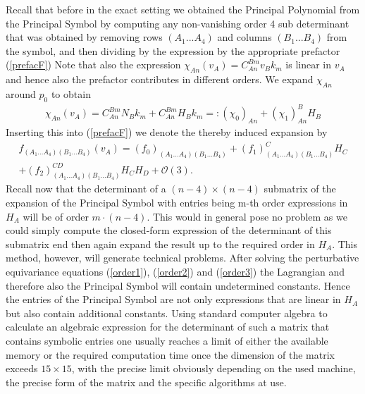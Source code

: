 \documentclass[a4paper,12pt, DIV=14, BCOR=5mm, twoside, headsepline, numbers=noenddot]{scrbook}
\begin{document}
Recall that before in the exact setting we obtained the Principal Polynomial from the Principal Symbol by computing any non-vanishing order 4 sub determinant that was obtained by removing rows $(A_1...A_4)$ and columns $(B_1...B_4)$ from the symbol, and then dividing by the expression by the appropriate prefactor (\ref{prefacF})
Note that also the expression $\chi_{An}(v_A) = C_{An}^{Bm}v_Bk_m$ is linear in $v_A$ and hence also the prefactor contributes in different orders. We expand $\chi_{An}$ around $p_0$ to obtain
\begin{align}
\chi_{An}(v_A) =  C^{Bm}_{An} N_B k_m + C^{Bm}_{An} H_B k_m =: (\chi_0)_{An} + (\chi_1)^B_{An}H_B
\end{align}
Inserting this into (\ref{prefacF}) we denote the thereby induced expansion by
\begin{multline}\label{prefacExp}
    f_{(A_1...A_4)(B_1...B_4)}(v_A) = (f_0)_{(A_1...A_4)(B_1...B_4)} + (f_1)^C_{(A_1...A_4)(B_1...B_4)}H_C\\ + (f_2)^{CD}_{(A_1...A_4)(B_1...B_4)}H_CH_D
    + \mathcal{O}(3).
\end{multline}
Recall now that the determinant of a $(n-4) \times (n-4)$ submatrix of the expansion of the Principal Symbol with entries being m-th order expressions in $H_A$ will be of order $m\cdot(n-4)$. This would in general pose no problem as we could simply compute the closed-form expression of the determinant of this submatrix end then again expand the result up to the required order in $H_A$. This method, however, will generate technical problems. After solving the perturbative equivariance equations (\ref{order1}), (\ref{order2}) and (\ref{order3}) the Lagrangian and therefore also the Principal Symbol will contain undetermined constants. Hence the entries of the Principal Symbol are not only expressions that are linear in $H_A$ but also contain additional constants. Using standard computer algebra to calculate an algebraic expression for the determinant of such a matrix that contains symbolic entries one usually reaches a limit of either the available memory or the required computation time once the dimension of the matrix exceeds $15 \times 15 $, with the precise limit obviously depending on the used machine, the precise form of the matrix and the specific algorithms at use. 
\end{document}
